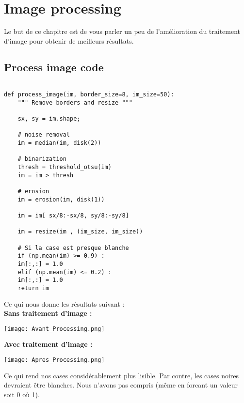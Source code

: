 
\chapter{Image processing} %

\label{Chapitre 4.1} %


Le but de ce chapitre est de vous parler un peu de l'amélioration du traitement d'image pour obtenir de meilleurs résultats.

\section{Process image code}


\begin{lstlisting}[frame=single,style=Python]  % Start your code-block

def process_image(im, border_size=8, im_size=50):
    """ Remove borders and resize """

    sx, sy = im.shape;

    # noise removal
    im = median(im, disk(2))

    # binarization
    thresh = threshold_otsu(im)
    im = im > thresh
	  
    # erosion
    im = erosion(im, disk(1))

    im = im[ sx/8:-sx/8, sy/8:-sy/8]

    im = resize(im , (im_size, im_size))

    # Si la case est presque blanche
    if (np.mean(im) >= 0.9) :
	im[:,:] = 1.0
    elif (np.mean(im) <= 0.2) :
	im[:,:] = 1.0
    return im
\end{lstlisting}


\pagebreak
Ce qui nous donne les résultats suivant : \\


\textbf{Sans traitement d'image :}
\begin{center} 
\hspace{15cm}
\texttt{[image: Avant\_Processing.png]}
\end{center}
\vspace{0.5cm} 

\textbf{Avec traitement d'image :}
\begin{center} 
\hspace{15cm}
\texttt{[image: Apres\_Processing.png]}
\end{center}
\vspace{0.5cm} 

Ce qui rend nos cases considérablement plus lisible. Par contre, les cases noires devraient être blanches. Nous n'avons pas compris (même en forcant un valeur soit 0 où 1).

